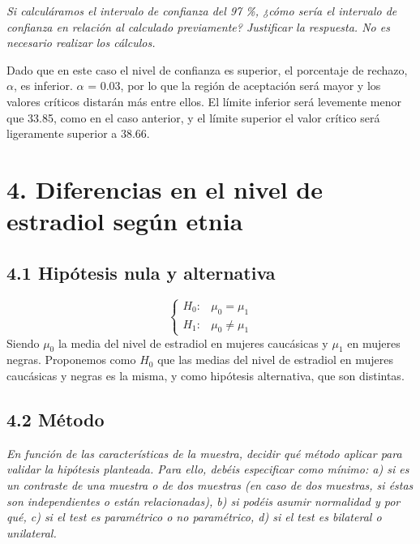 \documentclass[
]{article}
\begin{document}
\emph{Si calculáramos el intervalo de confianza del 97 \%, ¿cómo sería
el intervalo de confianza en relación al calculado previamente?
Justificar la respuesta. No es necesario realizar los cálculos.}

Dado que en este caso el nivel de confianza es superior, el porcentaje
de rechazo, \(\alpha\), es inferior. \(\alpha\) = 0.03, por lo que la
región de aceptación será mayor y los valores críticos distarán más
entre ellos. El límite inferior será levemente menor que 33.85, como en
el caso anterior, y el límite superior el valor crítico será ligeramente
superior a 38.66.

\hypertarget{diferencias-en-el-nivel-de-estradiol-seguxfan-etnia}{%
\section{4. Diferencias en el nivel de estradiol según
etnia}\label{diferencias-en-el-nivel-de-estradiol-seguxfan-etnia}}

\hypertarget{hipuxf3tesis-nula-y-alternativa-1}{%
\subsection{4.1 Hipótesis nula y
alternativa}\label{hipuxf3tesis-nula-y-alternativa-1}}

\[
\left\{
  \begin{array}{ll}
    H_{0}: &  \mu_{0}=\mu_{1}\\
    H_{1}: & \mu_{0} \neq \mu_{1}
  \end{array}
\right.
\] Siendo \(\mu_{0}\) la media del nivel de estradiol en mujeres
caucásicas y \(\mu_{1}\) en mujeres negras. Proponemos como \(H_0\) que
las medias del nivel de estradiol en mujeres caucásicas y negras es la
misma, y como hipótesis alternativa, que son distintas.

\hypertarget{muxe9todo-1}{%
\subsection{4.2 Método}\label{muxe9todo-1}}

\emph{En función de las características de la muestra, decidir qué
método aplicar para validar la hipótesis planteada. Para ello, debéis
especificar como mínimo: a) si es un contraste de una muestra o de dos
muestras (en caso de dos muestras, si éstas son independientes o están
relacionadas), b) si podéis asumir normalidad y por qué, c) si el test
es paramétrico o no paramétrico, d) si el test es bilateral o
unilateral.}
\end{document}
